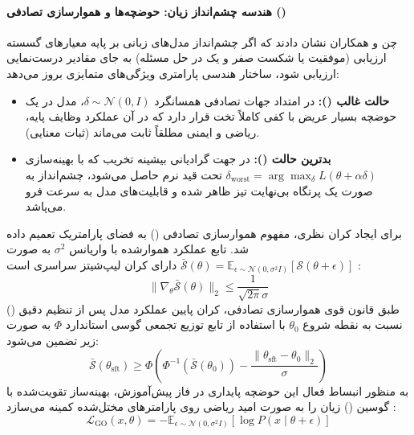 \paragraph*{هندسه چشم‌انداز زیان: حوضچه‌ها و هموارسازی تصادفی ()}
چن و همکاران \cite{chen2026unveiling} نشان دادند که اگر چشم‌انداز مدل‌های زبانی بر پایه معیارهای گسسته ارزیابی (موفقیت یا شکست صفر و یک در حل مسئله) به جای مقادیر درست‌نمایی ارزیابی شود، ساختار هندسی پارامتری ویژگی‌های متمایزی بروز می‌دهد:
\begin{itemize}
    \item \textbf{حالت غالب ():} در امتداد جهات تصادفی همسانگرد $\delta \sim \mathcal{N}(0, I)$، مدل در یک حوضچه بسیار عریض با کفی کاملاً تخت قرار دارد که در آن عملکرد وظایف پایه، ریاضی و ایمنی مطلقاً ثابت می‌ماند (ثبات معنایی).
    \item \textbf{بدترین حالت ():} در جهت گرادیانی بیشینه تخریب که با بهینه‌سازی $\delta_{\text{worst}} = \arg\max_\delta L(\theta + \alpha \delta)$ تحت قید نرم حاصل می‌شود، چشم‌انداز به صورت یک پرتگاه بی‌نهایت تیز ظاهر شده و قابلیت‌های مدل به سرعت فرو می‌پاشد.
\end{itemize}
برای ایجاد کران نظری، مفهوم هموارسازی تصادفی () به فضای پارامتریک تعمیم داده شد. تابع عملکرد هموارشده با واریانس $\sigma^2$ به صورت $\bar{\mathcal{S}}(\theta) = \mathbb{E}_{\epsilon \sim \mathcal{N}(0, \sigma^2 I)} [\mathcal{S}(\theta + \epsilon)]$ دارای کران لیپ‌شیتز سراسری است \cite{chen2026unveiling}:
\begin{equation}
    \|\nabla_\theta \bar{\mathcal{S}}(\theta)\|_2 \le \frac{1}{\sqrt{2\pi}\sigma}
\end{equation}
طبق قانون قوی هموارسازی تصادفی، کران پایین عملکرد مدل پس از تنظیم دقیق () نسبت به نقطه شروع $\theta_0$ با استفاده از تابع توزیع تجمعی گوسی استاندارد $\Phi$ به صورت زیر تضمین می‌شود:
\begin{equation}
    \bar{\mathcal{S}}(\theta_{\text{sft}}) \ge \Phi \left( \Phi^{-1}(\bar{\mathcal{S}}(\theta_0)) - \frac{\|\theta_{\text{sft}} - \theta_0\|_2}{\sigma} \right)
\end{equation}
به منظور انبساط فعال این حوضچه پایداری در فاز پیش‌آموزش، بهینه‌ساز تقویت‌شده با گوسین () زیان را به صورت امید ریاضی روی پارامترهای مختل‌شده کمینه می‌سازد \cite{chen2026unveiling}:
\begin{equation}
    \mathcal{L}_{\text{GO}}(x, \theta) = - \mathbb{E}_{\epsilon \sim \mathcal{N}(0, \sigma^2 I)} \left[ \log P(x \mid \theta + \epsilon) \right]
\end{equation}


